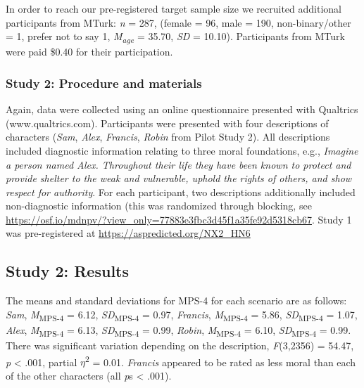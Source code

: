 \documentclass[
  english,
  man,floatsintext]{apa7}
\begin{document}
In order to reach our pre-registered target sample size we recruited additional participants from MTurk: \emph{n} = 287, (female = 96, male = 190, non-binary/other = 1, prefer not to say 1, \emph{M\textsubscript{age}} = 35.70, \emph{SD} = 10.10). Participants from MTurk were paid \$0.40 for their participation.

\hypertarget{study-2-procedure-and-materials}{%
\subsubsection{Study 2: Procedure and materials}\label{study-2-procedure-and-materials}}

Again, data were collected using an online questionnaire presented with Qualtrics (www.qualtrics.com). Participants were presented with four descriptions of characters (\emph{Sam}, \emph{Alex}, \emph{Francis}, \emph{Robin} from Pilot Study 2). All descriptions included diagnostic information relating to three moral foundations, e.g., \emph{Imagine a person named Alex. Throughout their life they have been known to protect and provide shelter to the weak and vulnerable, uphold the rights of others, and show respect for authority}. For each participant, two descriptions additionally included non-diagnostic information (this was randomized through blocking, see \color{blue}\url{https://osf.io/mdnpv/?view_only=77883e3fbc3d45f1a35fe92d5318cb67}\color{black}. Study 1 was pre-registered at \color{blue}\url{https://aspredicted.org/NX2_HN6}\color{black}

\hypertarget{study-2-results}{%
\subsection{Study 2: Results}\label{study-2-results}}

The means and standard deviations for MPS-4 for each scenario are as follows:
\emph{Sam},
\emph{M}\textsubscript{MPS-4} = 6.12, \emph{SD}\textsubscript{MPS-4} = 0.97,
\emph{Francis},
\emph{M}\textsubscript{MPS-4} = 5.86, \emph{SD}\textsubscript{MPS-4} = 1.07,
\emph{Alex},
\emph{M}\textsubscript{MPS-4} = 6.13, \emph{SD}\textsubscript{MPS-4} = 0.99,
\emph{Robin},
\emph{M}\textsubscript{MPS-4} = 6.10, \emph{SD}\textsubscript{MPS-4} = 0.99. There was significant variation depending on the description, \emph{F}(3,2356) = 54.47, \emph{p} \textless{} .001, partial \(\eta\)\textsuperscript{2} = 0.01. \emph{Francis} appeared to be rated as less moral than each of the other characters (all \emph{p}s \textless{} .001).
\end{document}
